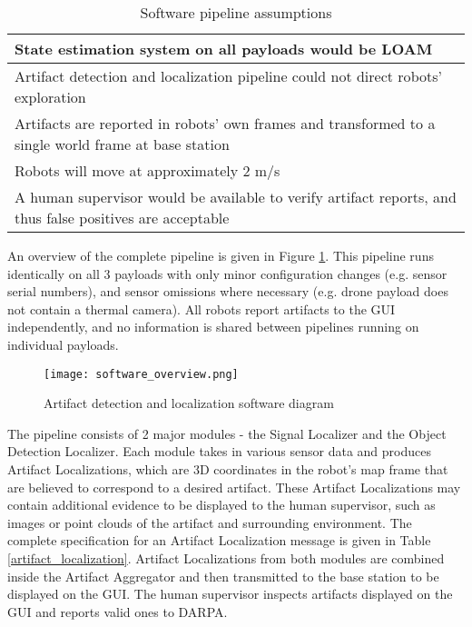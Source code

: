 \begin{table}
	\centering
	\begin{adjustbox}{max width=.95\textwidth}
		\begin{tabular}{ |l| } 
			\hline
State estimation system on all payloads would be LOAM \\ \hline
Artifact detection and localization pipeline could not direct robots' exploration \\ \hline 
Artifacts are reported in robots' own frames and transformed to a single world frame at base station \\ \hline
Robots will move at approximately 2 m/s \\ \hline
A human supervisor would be available to verify artifact reports, and thus false positives are acceptable \\ \hline
		\end{tabular}
	\end{adjustbox}
	\caption{Software pipeline assumptions}
	\label{software_assumptions}
\end{table}

An overview of the complete pipeline is given in Figure \ref{software_overview}. This pipeline runs identically on all 3 payloads with only minor configuration changes (e.g. sensor serial numbers), and sensor omissions where necessary (e.g. drone payload does not contain a thermal camera). All robots report artifacts to the GUI independently, and no information is shared between pipelines running on individual payloads.

\begin{figure}	
	\centering
	\texttt{[image: software\_overview.png]}
	\caption{Artifact detection and localization software diagram}
	\label{software_overview}
\end{figure}

The pipeline consists of 2 major modules - the Signal Localizer and the Object Detection Localizer. Each module takes in various sensor data and produces Artifact Localizations, which are 3D coordinates in the robot's map frame that are believed to correspond to a desired artifact. These Artifact Localizations may contain additional evidence to be displayed to the human supervisor, such as images or point clouds of the artifact and surrounding environment. The complete specification for an Artifact Localization message is given in Table \ref{artifact_localization}. Artifact Localizations from both modules are combined inside the Artifact Aggregator and then transmitted to the base station to be displayed on the GUI. The human supervisor inspects artifacts displayed on the GUI and reports valid ones to DARPA.

